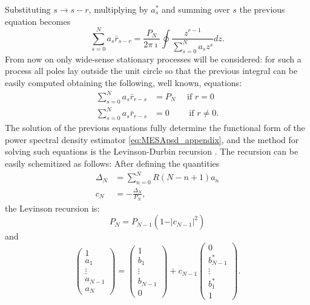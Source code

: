 \documentclass[twocolumn,showpacs,preprintnumbers,nofootinbib,prd,
superscriptaddress,10pt]{revtex4-1}
\begin{document}
Substituting $s \to s - r$, multiplying by $a^*_s$ and summing over $s$ the previous equation becomes 
\begin{equation}
    \sum_{s = 0}^N a_s \bar r_{s - r} = \frac{P_N}{2 \pi \imath}\oint \frac{z^{r -1}}{\sum_{s = 0}^N a_s z^s}dz.\label{eq:ErFilter}
\end{equation}
From now on only wide-sense stationary processes will be considered: for such a process all poles lay outside the unit circle so that the previous integral can be easily computed obtaining the following, well known, equations: 
\begin{align}\label{eq:errorFilter1}
    \sum_{s = 0}^N a_s \bar r_{r - s} &= P_N \quad \text{ if } r = 0 \\ \label{eq:errorFilter2}
    \sum_{s = 0}^N a_s \bar r_{r - s} & = 0 \qquad \text{ if } r \neq 0.
\end{align}
The solution of the previous equations fully determine the functional form of the power spectral density estimator \ref{eq:MESApsd_appendix}, and the method for solving such equations is the Levinson-Durbin recursion \cite{doi:10.1002/sapm1946251261}. The recursion can be easily schemitized as follows: 
After defining the quantities  
\begin{align}
\Delta_N &= \sum_{n = 0}^{N}R(N - n + 1)a_n \\ 
c_N &= - \frac{\Delta_N}{P_N},
\end{align} the Levinson recursion is: 
\begin{equation} \label{eq:Levinson1}
P_N = P_{N -1}\left(1 - \vert c_{N - 1} \vert ^2\right)
\end{equation}
and 
\begin{equation} \label{eq:Levinson2}
\begin{pmatrix}
1 \\ a_1 \\ \vdots \\ a_{N - 1} \\ a_N
\end{pmatrix}
= 
\begin{pmatrix}
1 \\ b_1 \\ \vdots \\ b_{N -1} \\ 0
\end{pmatrix}
+ c_{N-1}
\begin{pmatrix}
0 \\ b_{N -1}^* \\ \vdots \\ b^*_1 \\ 1
\end{pmatrix}. 
\end{equation}
\end{document}
